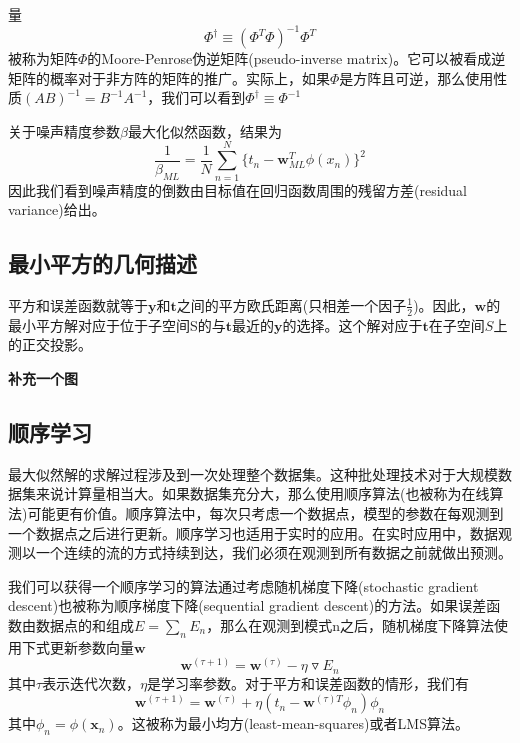 量
\begin{equation}
	\Phi^{\dagger}\equiv (\Phi^T\Phi)^{-1}\Phi^T
\end{equation}
被称为矩阵$\Phi$的Moore-Penrose伪逆矩阵(pseudo-inverse matrix)。它可以被看成逆矩阵的概率对于非方阵的矩阵的推广。实际上，如果$\Phi$是方阵且可逆，那么使用性质$(AB)^{-1}=B^{-1}A^{-1}$，我们可以看到$\Phi^{\dagger}\equiv \Phi^{-1}$

关于噪声精度参数$\beta$最大化似然函数，结果为
\begin{equation}
	\frac{1}{\beta_{ML}}=\frac{1}{N}\sum_{n=1}^{N}\{t_n-\boldsymbol{w}^T_{ML}\phi(x_n) \}^2
\end{equation}
因此我们看到噪声精度的倒数由目标值在回归函数周围的残留方差(residual variance)给出。
\subsection*{最小平方的几何描述}
平方和误差函数就等于$\boldsymbol{y}$和$\boldsymbol{t}$之间的平方欧氏距离(只相差一个因子$\frac{1}{2}$)。因此，$\boldsymbol{w}$的最小平方解对应于位于子空间S的与$\boldsymbol{t}$最近的$\boldsymbol{y}$的选择。这个解对应于$\boldsymbol{t}$在子空间$S$上的正交投影。

\textbf{补充一个图}
\subsection*{顺序学习}
最大似然解的求解过程涉及到一次处理整个数据集。这种批处理技术对于大规模数据集来说计算量相当大。如果数据集充分大，那么使用顺序算法(也被称为在线算法)可能更有价值。顺序算法中，每次只考虑一个数据点，模型的参数在每观测到一个数据点之后进行更新。顺序学习也适用于实时的应用。在实时应用中，数据观测以一个连续的流的方式持续到达，我们必须在观测到所有数据之前就做出预测。

我们可以获得一个顺序学习的算法通过考虑随机梯度下降(stochastic gradient descent)也被称为顺序梯度下降(sequential gradient descent)的方法。如果误差函数由数据点的和组成$E=\sum_n E_n$，那么在观测到模式n之后，随机梯度下降算法使用下式更新参数向量$\boldsymbol{w}$
\begin{equation}
	\boldsymbol{w}^{(\tau+1)}=\boldsymbol{w}^{(\tau)}-\eta \triangledown E_n
\end{equation}
其中$\tau$表示迭代次数，$\eta$是学习率参数。对于平方和误差函数的情形，我们有
\begin{equation}
	\boldsymbol{w}^{(\tau+1)}=\boldsymbol{w}^{(\tau)}+\eta (t_n-\boldsymbol{w}^{(\tau)T}\phi_n)\phi_n
\end{equation}
其中$\phi_n=\phi(\boldsymbol{x}_n)$。这被称为最小均方(least-mean-squares)或者LMS算法。
